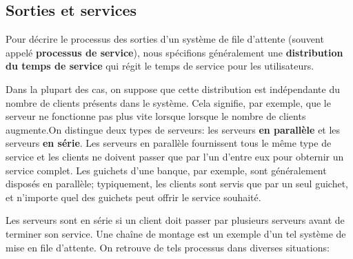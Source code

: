 \subsection{Sorties et services}
Pour décrire le processus des sorties d’un système de file d'attente (souvent appelé \textbf{processus de service}), nous spécifions généralement une \textbf{distribution du temps de service}  qui régit le temps de service pour les  utilisateurs. \par Dans la plupart des cas, on suppose que cette distribution est indépendante du nombre de clients présents dans le système. Cela signifie, par exemple, que le serveur ne fonctionne pas plus vite lorsque lorsque le nombre de clients augmente.\newl On distingue deux types de serveurs: les serveurs  \textbf{en parallèle} et les serveurs \textbf{en série}. Les serveurs en parallèle fournissent tous le même type de service et les clients ne doivent passer que par l'un d'entre eux pour obternir un service complet. Les guichets d'une banque, par exemple, sont généralement disposés en parallèle; typiquement, les clients sont servis que par un seul guichet, et n'importe quel des  guichets peut offrir le service souhaité. \par Les serveurs sont en série si un client doit passer par plusieurs serveurs avant de terminer son service. Une chaîne de montage est un exemple d'un tel système de mise en file d'attente.
\newl 
On retrouve de tels processus dans diverses situations:
